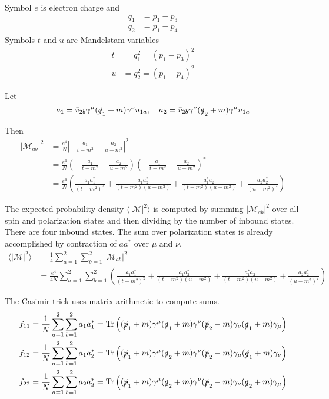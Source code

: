 \documentclass[12pt]{article}
\begin{document}
Symbol $e$ is electron charge and
\begin{align*}
q_1&=p_1-p_3
\\
q_2&=p_1-p_4
\end{align*}
Symbols $t$ and $u$ are Mandelstam variables
\begin{align*}
t&=q_1^2=(p_1-p_3)^2
\\
u&=q_2^2=(p_1-p_4)^2
\end{align*}

Let
\begin{equation*}
a_1=\bar{v}_{2b}\gamma^\mu(\slashed{q}_1+m)\gamma^\nu u_{1a},
\quad
a_2=\bar{v}_{2b}\gamma^\nu(\slashed{q}_2+m)\gamma^\mu u_{1a}
\end{equation*}

Then
\begin{align*}
|\mathcal{M}_{ab}|^2&=\frac{e^4}{N}\left|-\frac{a_1}{t-m^2}-\frac{a_2}{u-m^2}\right|^2\\
&=
\frac{e^4}{N}
\left(-\frac{a_1}{t-m^2}-\frac{a_2}{u-m^2}\right)
\left(-\frac{a_1}{t-m^2}-\frac{a_2}{u-m^2}\right)^*\\
&=
\frac{e^4}{N}\left(
\frac{a_1a_1^*}{(t-m^2)^2}
+\frac{a_1a_2^*}{(t-m^2)(u-m^2)}
+\frac{a_1^*a_2}{(t-m^2)(u-m^2)}
+\frac{a_2a_2^*}{(u-m^2)^2}
\right)
\end{align*}

The expected probability density $\langle|\mathcal{M}|^2\rangle$
is computed by summing $|\mathcal{M}_{ab}|^2$ over all spin and polarization states
and then dividing by the number of inbound states.
There are four inbound states.
The sum over polarization states is already accomplished by contraction
of $aa^*$ over $\mu$ and $\nu$.
\begin{align*}
\langle|\mathcal{M}|^2\rangle
&=\frac{1}{4}\sum_{a=1}^2\sum_{b=1}^2|\mathcal{M}_{ab}|^2\\
&=\frac{e^4}{4N}\sum_{a=1}^2\sum_{b=1}^2
\left(
\frac{a_1a_1^*}{(t-m^2)^2}
+\frac{a_1a_2^*}{(t-m^2)(u-m^2)}
+\frac{a_1^*a_2}{(t-m^2)(u-m^2)}
+\frac{a_2a_2^*}{(u-m^2)^2}
\right)
\end{align*}

The Casimir trick uses matrix arithmetic to compute sums.
\begin{align*}
f_{11}&=\frac{1}{N} \sum_{a=1}^2\sum_{b=1}^2 a_1a_1^*=\mathop{\rm Tr}
\left(
(\slashed{p}_1+m)\gamma^\mu(\slashed{q}_1+m)\gamma^\nu(\slashed{p}_2-m)\gamma_\nu(\slashed{q}_1+m)\gamma_\mu
\right)
\\
f_{12}&=\frac{1}{N} \sum_{a=1}^2\sum_{b=1}^2 a_1a_2^*=\mathop{\rm Tr}
\left(
(\slashed{p}_1+m)\gamma^\mu(\slashed{q}_2+m)\gamma^\nu(\slashed{p}_2-m)\gamma_\mu(\slashed{q}_1+m)\gamma_\nu
\right)
\\
f_{22}&=\frac{1}{N} \sum_{a=1}^2\sum_{b=1}^2 a_2a_2^*=\mathop{\rm Tr}
\left(
(\slashed{p}_1+m)\gamma^\mu(\slashed{q}_2+m)\gamma^\nu(\slashed{p}_2-m)\gamma_\nu(\slashed{q}_2+m)\gamma_\mu
\right)
\end{align*}
\end{document}
